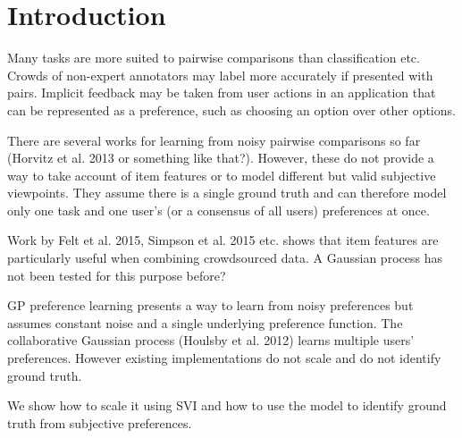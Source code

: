 \section{Introduction}\label{sec:intro}

Many tasks are more suited to pairwise comparisons than classification etc. 
Crowds of non-expert annotators may label more accurately if presented with pairs. 
Implicit feedback may be taken from user actions in an application that can be represented as a preference, such as choosing
an option over other options.

There are several works for learning from noisy pairwise comparisons so far (Horvitz et al. 2013 or something like that?). 
However, these do not provide a way to take account of item features or to model different but valid subjective viewpoints. 
They assume there is a single ground truth and can therefore model only one task and one user's (or a consensus of all users) preferences at once. 

Work by Felt et al. 2015, Simpson et al. 2015 etc. shows that item features are particularly useful when combining crowdsourced data. A Gaussian process has not been tested for this purpose before?

GP preference learning presents a way to learn from noisy preferences but assumes constant noise and a single underlying preference function. 
The collaborative Gaussian process (Houlsby et al. 2012) learns multiple users' preferences. 
However existing implementations do not scale and do not identify ground truth. 

We show how to scale it using SVI and how to use the model to identify ground truth from subjective preferences. 


